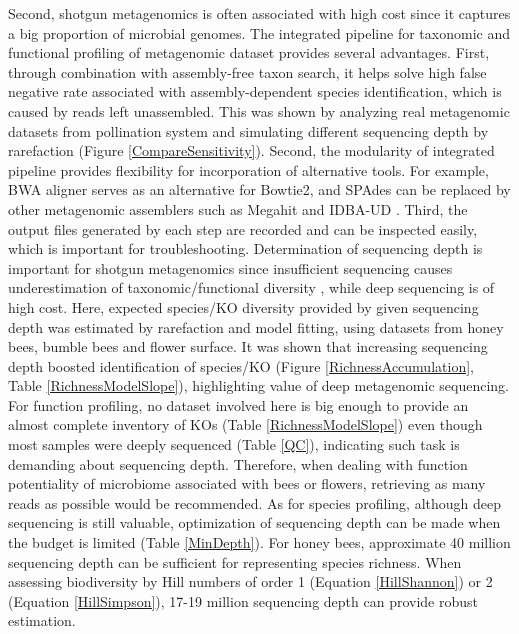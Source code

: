\documentclass[11pt]{article}
\begin{document}
Second, shotgun metagenomics is often associated with high cost since it captures a big proportion of microbial genomes. 
\newline
The integrated pipeline for taxonomic and functional profiling of metagenomic dataset provides several advantages. 
First, through combination with assembly-free taxon search, it helps solve high false negative rate associated with assembly-dependent species identification, which is caused by reads left unassembled. 
This was shown by analyzing real metagenomic datasets from pollination system and simulating different sequencing depth by rarefaction (Figure \ref{CompareSensitivity}). 
Second, the modularity of integrated pipeline provides flexibility for incorporation of alternative tools. 
For example, BWA aligner \citep{li2009fast} serves as an alternative for Bowtie2, and SPAdes can be replaced by other metagenomic assemblers such as Megahit \citep{li2015megahit} and IDBA-UD \citep{peng2012idba}. 
Third, the output files generated by each step are recorded and can be inspected easily, which is important for troubleshooting. 
\newline
Determination of sequencing depth is important for shotgun metagenomics since insufficient sequencing causes underestimation of taxonomic/functional diversity \citep{cattonaro2018you,zaheer2018impact,gweon2019impact,pereira2019impact}, while deep sequencing is of high cost. 
Here, expected species/KO diversity provided by given sequencing depth was estimated by rarefaction and model fitting, using datasets from honey bees, bumble bees and flower surface. 
It was shown that increasing sequencing depth boosted identification of species/KO (Figure \ref{RichnessAccumulation}, Table \ref{RichnessModelSlope}), highlighting value of deep metagenomic sequencing. 
For function profiling, no dataset involved here is big enough to provide an almost complete inventory of KOs (Table \ref{RichnessModelSlope}) even though most samples were deeply sequenced (Table \ref{QC}), indicating such task is demanding about sequencing depth. 
Therefore, when dealing with function potentiality of microbiome associated with bees or flowers, retrieving as many reads as possible would be recommended. 
As for species profiling, although deep sequencing is still valuable, optimization of sequencing depth can be made when the budget is limited (Table \ref{MinDepth}). 
For honey bees, approximate 40 million sequencing depth can be sufficient for representing species richness. 
When assessing biodiversity by Hill numbers of order 1 (Equation \ref{HillShannon}) or 2 (Equation \ref{HillSimpson}), 17-19 million sequencing depth can provide robust estimation. 
\end{document}
